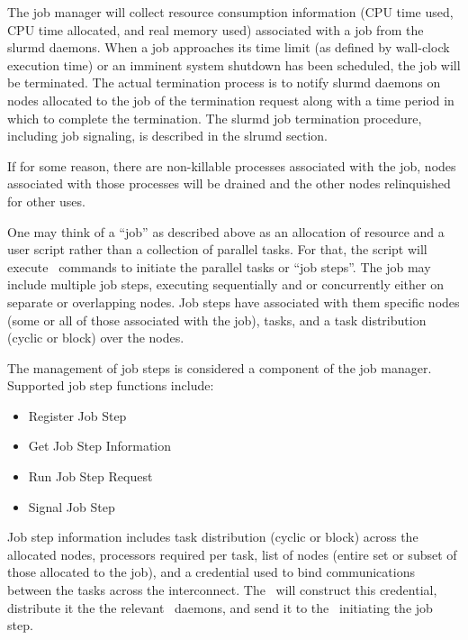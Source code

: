 The job manager will collect resource consumption information (CPU
time used, CPU time allocated, and real memory used) associated with
a job from the slurmd daemons.  When a job approaches its time limit
(as defined by wall-clock execution time) or an imminent system shutdown
has been scheduled, the job will be terminated.  The actual termination
process is to notify slurmd daemons on nodes allocated to the job of
the termination request along with a time period in which to complete
the termination.  The slurmd job termination procedure, including job
signaling, is described in the slrumd section.

If for some reason, there are non-killable processes associated with 
the job, nodes associated with those processes will be drained and 
the other nodes relinquished for other uses.

One may think of a ``job'' as described above as an allocation of resource 
and a user script rather than a collection of parallel tasks. For that, 
the script will execute \srun\ commands to initiate the parallel tasks 
or ``job steps''. The job may include multiple job steps, executing 
sequentially and or concurrently either on separate or overlapping nodes. 
Job steps have associated with them specific nodes (some or all of those 
associated with the job), tasks, and a task distribution (cyclic or 
block) over the nodes. 

The management of job steps is considered a component of the job 
manager. Supported job step functions include:
\begin{itemize}
\item Register Job Step
\item Get Job Step Information
\item Run Job Step Request
\item Signal Job Step
\end{itemize}
Job step information includes task distribution (cyclic or block) 
across the allocated nodes, processors required per task, list of 
nodes (entire set or subset of those allocated to the job), and a 
credential used to bind communications between the tasks across 
the interconnect. The \slurmctld\ will construct this credential, 
distribute it the the relevant \slurmd\ daemons, and send it to 
the \srun\ initiating the job step.

%

